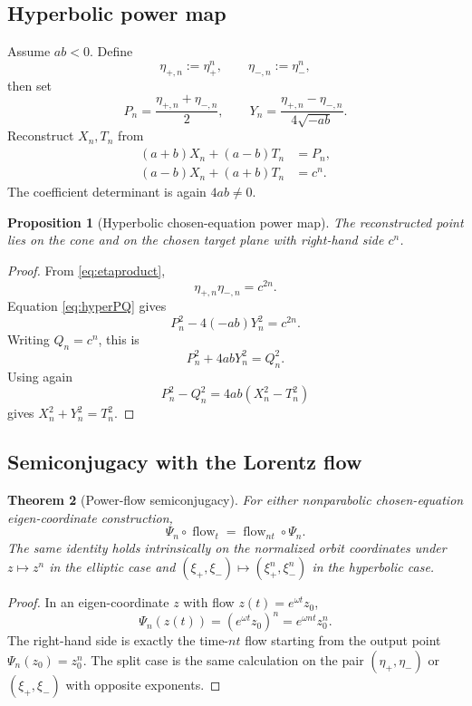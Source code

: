\documentclass[11pt]{amsart}
\newtheorem{theorem}{Theorem}[section]
\newtheorem{proposition}[theorem]{Proposition}
\theoremstyle{remark}
\begin{document}
\subsection{Hyperbolic power map}
Assume $ab<0$.  Define
\[
\eta_{+,n}:=\eta_+^n,
\qquad
\eta_{-,n}:=\eta_-^n,
\]
then set
\begin{equation}\label{eq:hyperPQ}
P_n=\frac{\eta_{+,n}+\eta_{-,n}}{2},
\qquad
Y_n=\frac{\eta_{+,n}-\eta_{-,n}}{4\sqrt{-ab}}.
\end{equation}
Reconstruct $X_n,T_n$ from
\begin{align}
(a+b)X_n+(a-b)T_n&=P_n,\label{eq:hyprec1}\\
(a-b)X_n+(a+b)T_n&=c^n.\label{eq:hyprec2}
\end{align}
The coefficient determinant is again $4ab\ne0$.

\begin{proposition}[Hyperbolic chosen-equation power map]\label{prop:hyppower}
The reconstructed point lies on the cone and on the chosen target plane with right-hand side $c^n$.
\end{proposition}

\begin{proof}
From \eqref{eq:etaproduct},
\[
\eta_{+,n}\eta_{-,n}=c^{2n}.
\]
Equation \eqref{eq:hyperPQ} gives
\[
P_n^2-4(-ab)Y_n^2=c^{2n}.
\]
Writing $Q_n=c^n$, this is
\[
P_n^2+4abY_n^2=Q_n^2.
\]
Using again
\[
P_n^2-Q_n^2=4ab(X_n^2-T_n^2)
\]
gives $X_n^2+Y_n^2=T_n^2$.
\end{proof}

\subsection{Semiconjugacy with the Lorentz flow}

\begin{theorem}[Power-flow semiconjugacy]\label{thm:semiconj}
For either nonparabolic chosen-equation eigen-coordinate construction,
\begin{equation}\label{eq:semiconj}
\boxed{
\Psi_n\circ\operatorname{flow}_t
=\operatorname{flow}_{nt}\circ\Psi_n.
}
\end{equation}
The same identity holds intrinsically on the normalized orbit coordinates under $z\mapsto z^n$ in the elliptic case and $(\xi_+,\xi_-)\mapsto(\xi_+^n,\xi_-^n)$ in the hyperbolic case.
\end{theorem}

\begin{proof}
In an eigen-coordinate $z$ with flow $z(t)=e^{\omega t}z_0$,
\[
\Psi_n(z(t))=(e^{\omega t}z_0)^n=e^{\omega nt}z_0^n.
\]
The right-hand side is exactly the time-$nt$ flow starting from the output point $\Psi_n(z_0)=z_0^n$.  The split case is the same calculation on the pair $(\eta_+,\eta_-)$ or $(\xi_+,\xi_-)$ with opposite exponents.
\end{proof}
\end{document}
